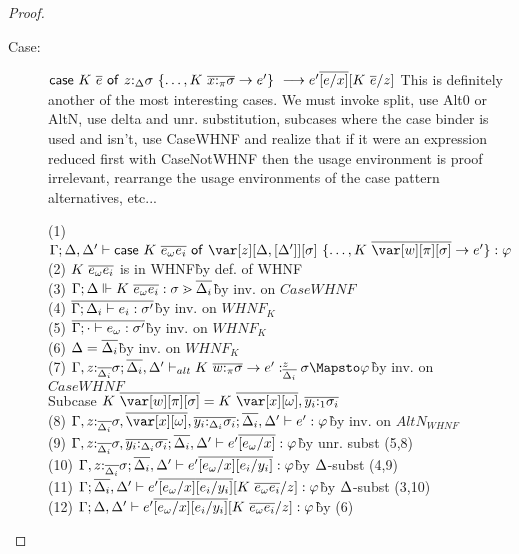 \begin{proof}
\begin{description}
\item[Case:]
    $\mathsf{case}~K~\overline{e}~\mathsf{of}~z{:}_{\Delta}\sigma~\{\dots,K~\overline{x{:}_\pi\sigma}\to e'\}\ \longrightarrow e'\overline{[e/x]}[K~\overline{e}/z]$
This is definitely another of the most interesting cases. We must invoke split,
use Alt0 or AltN, use delta and unr. substitution, subcases where the
case binder is used and isn't, use CaseWHNF and realize that if it were
an expression reduced first with CaseNotWHNF then the usage environment
is proof irrelevant, rearrange the usage environments of the case pattern alternatives, etc...
\begin{tabbing}
    (1) $\G;\D,\D'\vdash \ccase{K~\ov{e_\omega e_i}}{\zD~\{\dots,K~\ov{\var[w][\pi][\s]}\to e'\}} : \vp$\\
    (2) $K~\overline{e_\omega e_i}$ is in WHNF\` by def. of WHNF\\
    (3) $\Gamma;\Delta \Vdash K~\overline{e_\omega e_i} : \sigma \gtrdot \overline{\Delta_i} $\` by inv. on $CaseWHNF$\\
    (4) $\overline{\Gamma; \Delta_i \vdash e_i : \sigma'}$\`by inv. on $WHNF_K$\\
    (5) $\overline{\Gamma; \cdot \vdash e_\omega : \sigma'}$\`by inv. on $WHNF_K$\\
    (6) $\Delta = \overline{\Delta_i}$\` by inv. on $WHNF_K$\\
    (7) $\G, z{:}_{\ov{\D_i}}\s; \ov{\D_i}, \D' \vdash_{alt} K~\ov{w{:}_\pi\s} \to e' :_{\ov{\D_i}}^z \s \Mapsto \vp$\` by inv. on $CaseWHNF$\\
    Subcase $K~\ov{\var[w][\pi][\s]} = K~\ov{\xo},\ov{y_i{:}_1\s_i}$\\
    (8) $\G,z{:}_{\ov{\D_i}}\s,\ov{\xo},\ov{y_i{:}_{\D_i}\s_i}; \ov{\D_i}, \D' \vdash e' : \vp$\`by inv. on $AltN_{WHNF}$\\
    (9) $\Gamma,z{:}_{\overline{\Delta_i}}\sigma,\overline{y_i{:}_{\Delta_i}\sigma_i}; \overline{\Delta_i}, \Delta' \vdash e'\overline{[e_\omega/x]} : \varphi$\`by unr. subst (5,8)\\
    (10) $\Gamma,z{:}_{\overline{\Delta_i}}\sigma; \overline{\Delta_i}, \Delta' \vdash e'\overline{[e_\omega/x]}\overline{[e_i/y_i]} : \varphi$\`by $\Delta$-subst (4,9)\\
    (11) $\Gamma; \overline{\Delta_i}, \Delta' \vdash e'\overline{[e_\omega/x]}\overline{[e_i/y_i]}[K~\overline{e_\omega e_i}/z] : \varphi$\`by $\Delta$-subst (3,10)\\
    (12) $\Gamma; \Delta, \Delta'\vdash e'\overline{[e_\omega/x]}\overline{[e_i/y_i]}[K~\overline{e_\omega e_i}/z] : \varphi$\`by (6)\\

\end{tabbing}
\end{description}
\end{proof}
